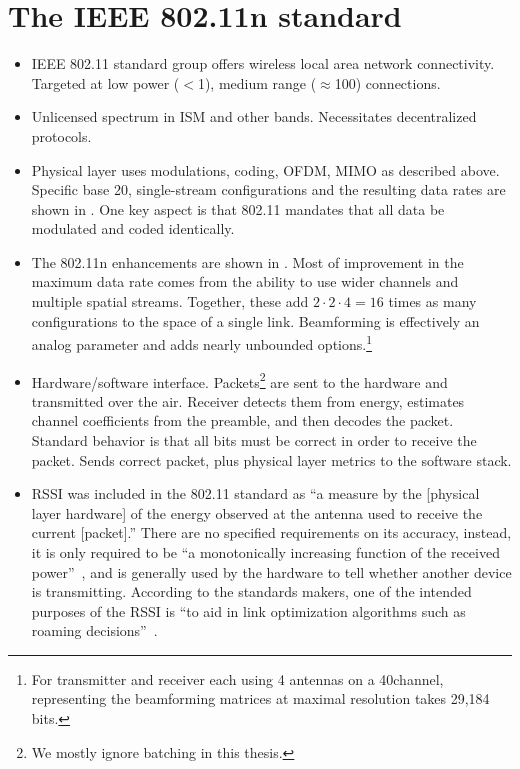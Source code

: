 \section{The IEEE 802.11n standard}
\begin{itemize}
\item IEEE 802.11 standard group offers wireless local area network connectivity. Targeted at low power ($<$1\W), medium range ($\approx$100\m) connections.
\item Unlicensed spectrum in ISM and other bands. Necessitates decentralized protocols.
\item Physical layer uses modulations, coding, OFDM, MIMO as described above. Specific base 20\MHz, single-stream configurations and the resulting data rates are shown in . One key aspect is that 802.11 mandates that all data be modulated and coded identically.
\item The 802.11n enhancements are shown in . Most of improvement in the maximum data rate comes from the ability to use wider channels and multiple spatial streams. Together, these add $2\cdot2\cdot4=16$ times as many configurations to the space of a single link. Beamforming is effectively an analog parameter and adds nearly unbounded options.\footnote{For transmitter and receiver each using 4 antennas on a 40\MHz channel, representing the beamforming matrices at maximal resolution takes 29,184 bits.}
\item Hardware/software interface. Packets\footnote{We mostly ignore batching in this thesis.} are sent to the hardware and transmitted over the air. Receiver detects them from energy, estimates channel coefficients from the preamble, and then decodes the packet. Standard behavior is that all bits must be correct in order to receive the packet. Sends correct packet, plus physical layer metrics to the software stack.

\item RSSI was included in the 802.11 standard as ``a measure by the [physical layer hardware] of the energy observed at the antenna used to receive the current [packet].'' There are no specified requirements on its accuracy, instead, it is only required to be ``a monotonically increasing function of the received power''~\cite[\S 17.2.3.2]{80211}, and is generally used by the hardware to tell whether another device is transmitting. According to the standards makers, one of the intended purposes of the RSSI is ``to aid in link optimization algorithms such as roaming decisions''~\cite[\S 19.9.5.10]{80211}.
\end{itemize}

